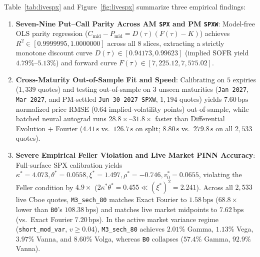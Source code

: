 \documentclass[preprint,12pt]{elsarticle}
\begin{document}
Table~\ref{tab:livespx} and Figure~\ref{fig:livespx} summarize three empirical findings:
\begin{enumerate}
  \item \textbf{Seven-Nine Put--Call Parity Across AM \texttt{SPX} and PM \texttt{SPXW}}: Model-free OLS parity regression ($C_{\mathrm{mid}} - P_{\mathrm{mid}} = D(\tau)(F(\tau) - K)$) achieves $R^2 \in [0.9999995, 1.0000000]$ across all $8$ slices, extracting a strictly monotone discount curve $D(\tau) \in [0.94173, 0.99623]$ (implied SOFR yield $4.79\%\text{--}5.13\%$) and forward curve $F(\tau) \in [7{,}225.12, 7{,}575.02]$.
  \item \textbf{Cross-Maturity Out-of-Sample Fit and Speed}: Calibrating on $5$ expiries ($1{,}339$ quotes) and testing out-of-sample on $3$ unseen maturities (\texttt{Jan 2027}, \texttt{Mar 2027}, and PM-settled \texttt{Jun 30 2027 SPXW}, $1{,}194$ quotes) yields $\mathbf{7.60\,\mathrm{bps}}$ normalized price RMSE ($\mathbf{0.64}$ implied-volatility points) out-of-sample, while batched neural autograd runs $\mathbf{28.8\times\text{--}31.8\times}$ faster than Differential Evolution + Fourier ($4.41\,\mathrm{s}$ vs.\ $126.7\,\mathrm{s}$ on split; $8.80\,\mathrm{s}$ vs.\ $279.8\,\mathrm{s}$ on all $2{,}533$ quotes).
  \item \textbf{Severe Empirical Feller Violation and Live Market PINN Accuracy}: Full-surface SPX calibration yields $\kappa^* = 4.073, \theta^* = 0.0558, \xi^* = 1.497, \rho^* = -0.746, v_0^* = 0.0655$, violating the Feller condition by $\mathbf{4.9\times}$ ($2\kappa^*\theta^* = 0.455 \ll (\xi^*)^2 = 2.241$). Across all $2{,}533$ live Cboe quotes, \texttt{M3\_sech\_80} matches Exact Fourier to $\mathbf{1.58\,\mathrm{bps}}$ ($\mathbf{68.8\times}$ lower than \texttt{B0}'s $108.38\,\mathrm{bps}$) and matches live market midpoints to $\mathbf{7.62\,\mathrm{bps}}$ (vs.\ Exact Fourier $7.20\,\mathrm{bps}$). In the active market variance regime (\texttt{short\_mod\_var}, $v \ge 0.04$), \texttt{M3\_sech\_80} achieves $\mathbf{2.01\%}$ Gamma, $\mathbf{1.13\%}$ Vega, $\mathbf{3.97\%}$ Vanna, and $\mathbf{8.60\%}$ Volga, whereas \texttt{B0} collapses ($57.4\%$ Gamma, $92.9\%$ Vanna).
\end{enumerate}
\end{document}
